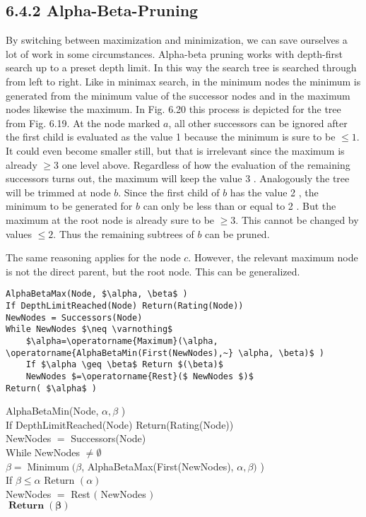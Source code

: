\documentclass[10pt]{article}
\begin{document}
\subsection*{6.4.2 Alpha-Beta-Pruning}
By switching between maximization and minimization, we can save ourselves a lot of work in some circumstances. Alpha-beta pruning works with depth-first search up to a preset depth limit. In this way the search tree is searched through from left to right. Like in minimax search, in the minimum nodes the minimum is generated from the minimum value of the successor nodes and in the maximum nodes likewise the maximum. In Fig. 6.20 this process is depicted for the tree from Fig. 6.19. At the node marked $a$, all other successors can be ignored after the first child is evaluated as the value 1 because the minimum is sure to be $\leq 1$. It could even become smaller still, but that is irrelevant since the maximum is already $\geq 3$ one level above. Regardless of how the evaluation of the remaining successors turns out, the maximum will keep the value 3 . Analogously the tree will be trimmed at node $b$. Since the first child of $b$ has the value 2 , the minimum to be generated for $b$ can only be less than or equal to 2 . But the maximum at the root node is already sure to be $\geq 3$. This cannot be changed by values $\leq 2$. Thus the remaining subtrees of $b$ can be pruned.

The same reasoning applies for the node $c$. However, the relevant maximum node is not the direct parent, but the root node. This can be generalized.

\begin{verbatim}
AlphaBetaMax(Node, $\alpha, \beta$ )
If DepthLimitReached(Node) Return(Rating(Node))
NewNodes = Successors(Node)
While NewNodes $\neq \varnothing$
    $\alpha=\operatorname{Maximum}(\alpha, \operatorname{AlphaBetaMin(First(NewNodes),~} \alpha, \beta)$ )
    If $\alpha \geq \beta$ Return $(\beta)$
    NewNodes $=\operatorname{Rest}($ NewNodes $)$
Return( $\alpha$ )
\end{verbatim}

AlphaBetaMin(Node, $\alpha, \beta$ )\\
If DepthLimitReached(Node) Return(Rating(Node))\\
NewNodes $=$ Successors(Node)\\
While NewNodes $\neq \emptyset$\\
$\beta=\operatorname{Minimum}(\beta$, AlphaBetaMax(First(NewNodes), $\alpha, \beta)$ )\\
If $\beta \leq \alpha$ Return $(\alpha)$\\
NewNodes $=$ Rest $($ NewNodes $)$\\
$\boldsymbol{\operatorname { R e t u r n }}(\boldsymbol{\beta})$
\end{document}
